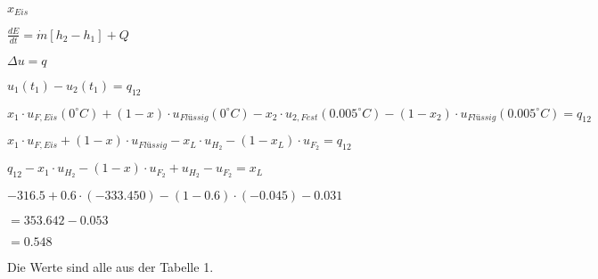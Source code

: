 \( x_{Eis} \)  

\( \frac{dE}{dt} = \dot{m} [h_2 - h_1] + Q \)  

\( \Delta u = q \)  

\( u_1 (t_1) - u_2 (t_1) = q_{12} \)  

\( x_1 \cdot u_{F,Eis} (0^\circ C) + (1 - x) \cdot u_{Flüssig} (0^\circ C) - x_2 \cdot u_{2,Fest} (0.005^\circ C) - (1 - x_2) \cdot u_{Flüssig} (0.005^\circ C) = q_{12} \)  

\( x_1 \cdot u_{F,Eis} + (1 - x) \cdot u_{Flüssig} - x_L \cdot u_{H_2} - (1 - x_L) \cdot u_{F_2} = q_{12} \)  

\( q_{12} - x_1 \cdot u_{H_2} - (1 - x) \cdot u_{F_2} + u_{H_2} - u_{F_2} = x_L \)  

\( -316.5 + 0.6 \cdot (-333.450) - (1 - 0.6) \cdot (-0.045) - 0.031 \)  

\( = 353.642 - 0.053 \)  

\( = 0.548 \)  

Die Werte sind alle aus der Tabelle 1.